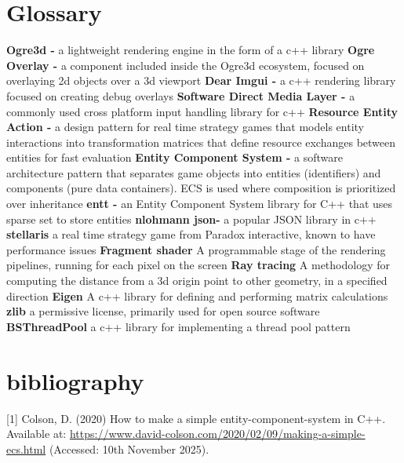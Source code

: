\documentclass[]{final_report}
\begin{document}
\chapter{Glossary}
\textbf{Ogre3d - }a lightweight rendering engine in the form of a c++ library \newline
\textbf{Ogre Overlay -} a component included inside the Ogre3d ecosystem, focused on overlaying 2d objects over a 3d viewport \newline
\textbf{Dear Imgui - }a c++ rendering library focused on creating debug overlays \newline
\textbf{Software Direct Media Layer -} a commonly used cross platform input handling library for c++ \newline
\textbf{Resource Entity Action - }a design pattern for real time strategy games that 
models entity interactions into transformation matrices that define resource exchanges between entities for fast evaluation \newline
\textbf{Entity Component System - }a software architecture pattern that separates
game objects into entities (identifiers) and components (pure data containers).
ECS is used where composition is prioritized over inheritance \newline
\textbf{entt - }an Entity Component System library for C++ that uses sparse set to
store entities \newline
\textbf{nlohmann json-} a popular JSON library in c++ \newline
\textbf{stellaris} a real time strategy game from Paradox interactive, known to have performance issues \newline
\textbf{Fragment shader} A programmable stage of the rendering pipelines, running for each pixel on the screen\newline
\textbf{Ray tracing} A methodology for computing the distance from a 3d origin point to other geometry, in a specified direction \newline
\textbf{Eigen} A c++ library for defining and performing matrix calculations \newline
\textbf{zlib} a permissive license, primarily used for open source software \newline
\textbf{BSThreadPool} a c++ library for implementing a thread pool pattern \newline

\chapter{bibliography}
[1] Colson, D. (2020) How to make a simple entity-component-system in C++. Available at: \url{https://www.david-colson.com/2020/02/09/making-a-simple-ecs.html} (Accessed: 10th November 2025). \newline
\end{document}
